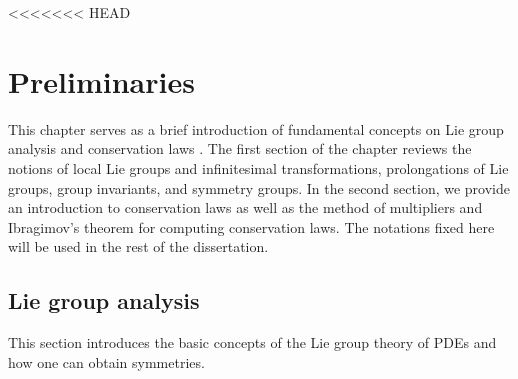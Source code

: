 <<<<<<< HEAD
\chapter{Preliminaries \label{ch2}}
This chapter serves as a brief introduction of fundamental concepts on Lie group analysis \citep{ibragimov} and conservation laws  \cite{ibragimov2007new}. The first section of the chapter reviews the notions of local Lie groups and infinitesimal transformations, prolongations of Lie groups, group invariants, and symmetry groups. In the second section, we provide an introduction to conservation laws as well as the method of multipliers and Ibragimov's theorem for computing conservation laws. The notations fixed here will be used in the rest of the dissertation.
\section{Lie group analysis} 
This section introduces the basic concepts of the Lie group theory of PDEs and how one can obtain symmetries.

